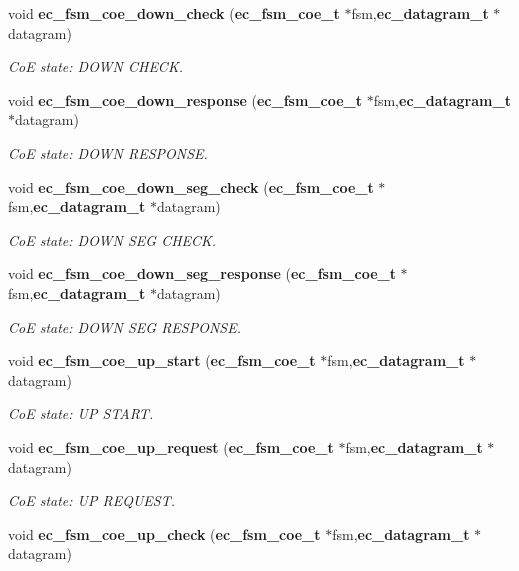 \begin{DoxyCompactItemize}
void {\bf ec\-\_\-fsm\-\_\-coe\-\_\-down\-\_\-check} ({\bf ec\-\_\-fsm\-\_\-coe\-\_\-t} $\ast$fsm,{\bf ec\-\_\-datagram\-\_\-t} $\ast$datagram)
\begin{DoxyCompactList}\small\item\em Co\-E state\-: D\-O\-W\-N C\-H\-E\-C\-K. \end{DoxyCompactList}\item 
void {\bf ec\-\_\-fsm\-\_\-coe\-\_\-down\-\_\-response} ({\bf ec\-\_\-fsm\-\_\-coe\-\_\-t} $\ast$fsm,{\bf ec\-\_\-datagram\-\_\-t} $\ast$datagram)
\begin{DoxyCompactList}\small\item\em Co\-E state\-: D\-O\-W\-N R\-E\-S\-P\-O\-N\-S\-E. \end{DoxyCompactList}\item 
void {\bf ec\-\_\-fsm\-\_\-coe\-\_\-down\-\_\-seg\-\_\-check} ({\bf ec\-\_\-fsm\-\_\-coe\-\_\-t} $\ast$fsm,{\bf ec\-\_\-datagram\-\_\-t} $\ast$datagram)
\begin{DoxyCompactList}\small\item\em Co\-E state\-: D\-O\-W\-N S\-E\-G C\-H\-E\-C\-K. \end{DoxyCompactList}\item 
void {\bf ec\-\_\-fsm\-\_\-coe\-\_\-down\-\_\-seg\-\_\-response} ({\bf ec\-\_\-fsm\-\_\-coe\-\_\-t} $\ast$fsm,{\bf ec\-\_\-datagram\-\_\-t} $\ast$datagram)
\begin{DoxyCompactList}\small\item\em Co\-E state\-: D\-O\-W\-N S\-E\-G R\-E\-S\-P\-O\-N\-S\-E. \end{DoxyCompactList}\item 
void {\bf ec\-\_\-fsm\-\_\-coe\-\_\-up\-\_\-start} ({\bf ec\-\_\-fsm\-\_\-coe\-\_\-t} $\ast$fsm,{\bf ec\-\_\-datagram\-\_\-t} $\ast$datagram)
\begin{DoxyCompactList}\small\item\em Co\-E state\-: U\-P S\-T\-A\-R\-T. \end{DoxyCompactList}\item 
void {\bf ec\-\_\-fsm\-\_\-coe\-\_\-up\-\_\-request} ({\bf ec\-\_\-fsm\-\_\-coe\-\_\-t} $\ast$fsm,{\bf ec\-\_\-datagram\-\_\-t} $\ast$datagram)
\begin{DoxyCompactList}\small\item\em Co\-E state\-: U\-P R\-E\-Q\-U\-E\-S\-T. \end{DoxyCompactList}\item 
void {\bf ec\-\_\-fsm\-\_\-coe\-\_\-up\-\_\-check} ({\bf ec\-\_\-fsm\-\_\-coe\-\_\-t} $\ast$fsm,{\bf ec\-\_\-datagram\-\_\-t} $\ast$datagram)

\end{DoxyCompactItemize}

